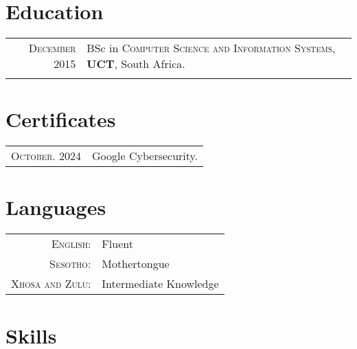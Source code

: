 \documentclass[a4paper,10pt]{article} %
\begin{document}
\section{Education}

\begin{tabular}{rl}	
\textsc{December} 2015 & BSc in \textsc{Computer Science and Information Systems}, \textbf{UCT}, South Africa.\\
&\\
\end{tabular}


\section{Certificates}

\begin{tabular}{rl}
\textsc{October.} 2024 & Google Cybersecurity.\\
\end{tabular}


\section{Languages}

\begin{tabular}{rl}
\textsc{English:} & Fluent\\
\textsc{Sesotho:} & Mothertongue\\
\textsc{Xhosa and Zulu:} & Intermediate Knowledge\\
\end{tabular}


\section{Skills}
\end{document}
